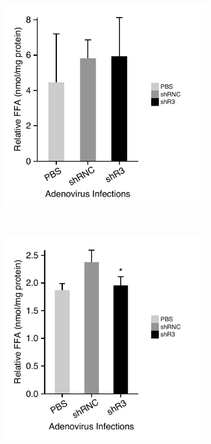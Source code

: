 \begin{figure}[!tb]
\centering
	\begin{subfigure}[t]{0.48\textwidth}
	\includegraphics[width=1\textwidth]{figs/fig2-19a hepa ffa uptake.pdf}
    \label{fig:fig2.19a}
	\end{subfigure} %
~
	\begin{subfigure}[t]{0.48\textwidth}
	\includegraphics[width=1\textwidth]{figs/fig2-19b hepa ffa intracellular.pdf}

\end{subfigure}
\end{figure}
